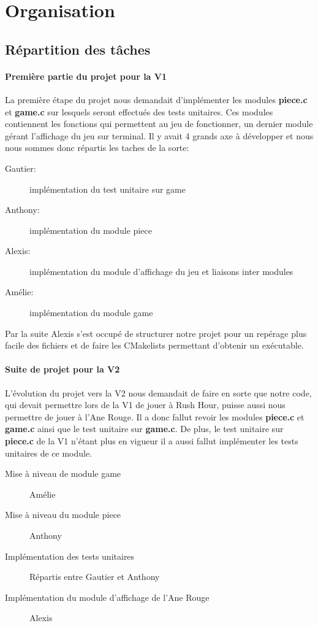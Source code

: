 \documentclass{report}
\begin{document}
\chapter{Organisation}
\setcounter{section}{0}
\section{Répartition des tâches}
\subsubsection*{Première partie du projet pour la V1}
La première étape du projet nous demandait d'implémenter les modules \textbf{piece.c} et \textbf{game.c} sur lesquels seront effectués des tests unitaires. Ces modules contiennent les fonctions qui permettent au jeu de fonctionner, un dernier module gérant l'affichage du jeu sur terminal. Il y avait 4 grands axe à développer et nous nous sommes donc répartis les taches de la sorte:
\begin{description}
\item [Gautier:] implémentation du test unitaire sur game
\item [Anthony:] implémentation du module piece
\item [Alexis:] implémentation du module d'affichage du jeu et liaisons inter modules
\item [Amélie:] implémentation du module game
\end{description}
Par la suite Alexis s'est occupé de structurer notre projet pour un repérage plus facile des fichiers et de faire les CMakelists permettant d'obtenir un exécutable.
\subsubsection*{Suite de projet pour la V2}
L'évolution du projet vers la V2 nous demandait de faire en sorte que notre code, qui devait permettre lors de la V1 de jouer à Rush Hour, puisse aussi nous permettre de jouer à l'Ane Rouge. Il a donc fallut revoir les modules \textbf{piece.c} et \textbf{game.c} ainsi que le test unitaire sur \textbf{game.c}. De plus, le test unitaire sur \textbf{piece.c} de la V1 n'étant plus en vigueur il a aussi fallut implémenter les tests unitaires de ce module.
\begin{description}
\item [Mise à niveau de module game] Amélie
\item [Mise à niveau du module piece] Anthony
\item [Implémentation des tests unitaires] Répartis entre Gautier et Anthony
\item [Implémentation du module d'affichage de l'Ane Rouge] Alexis
\end{description}
\end{document}
